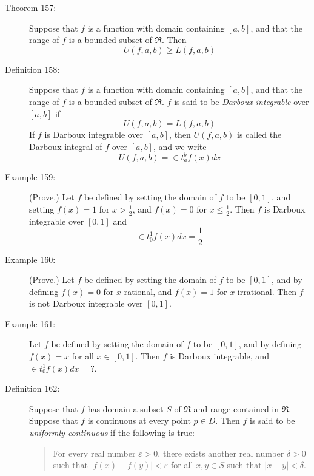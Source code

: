 \documentclass{article}
\begin{document}
\begin{description}
  \item[Theorem 157:] Suppose that $f$ is a function with domain containing $[a,b]$, and that the range of $f$ is a bounded subset of $\Re$. Then
    \begin{equation*}
    U(f,a,b) \geq L(f,a,b)
    \end{equation*}

  \item[Definition 158:] Suppose that $f$ is a function with domain containing $[a,b]$, and that the range of $f$ is a bounded subset of $\Re$. $f$ is said to be \emph{Darboux integrable} over $[a,b]$ if
    \begin{equation*}
    U(f,a,b) = L(f,a,b)
    \end{equation*}
    If $f$ is Darboux integrable over $[a,b]$, then $U(f,a,b)$ is called the Darboux integral of $f$ over $[a,b]$, and we write
    \begin{equation*}
    U(f,a,b) = \in t_{a}^{b} f(x) dx
    \end{equation*}

  \item[Example 159:] (Prove.) Let $f$ be defined by setting the domain of $f$ to be $[0,1]$, and setting $f(x)=1$ for $x > \frac{1}{2}$, and $f(x)=0$ for $x \leq \frac{1}{2}$. Then $f$ is Darboux integrable over $[0,1]$ and
    \begin{equation*}
    \in t_{0}^{1} f(x) dx = \frac{1}{2}
    \end{equation*}

  \item[Example 160:] (Prove.) Let $f$ be defined by setting the domain of $f$ to be $[0,1]$, and by defining $f(x) = 0$ for $x$ rational, and $f(x) =1$ for $x$ irrational. Then $f$ is not Darboux integrable over $[0,1]$.

  \item[Example 161:] Let $f$ be defined by setting the domain of $f$ to be $[0,1]$, and by defining $f(x) = x$ for all $x \in [0,1]$. Then $f$ is Darboux integrable, and $\in t_{0}^{1}f(x) dx = ?$.

  \item[Definition 162:] Suppose that $f$ has domain a subset $S$ of $\Re$ and range contained in $\Re$. Suppose that $f$ is continuous at every point $p \in D$. Then $f$ is said to be \emph{uniformly continuous} if the following is true: 
    \begin{quote}
    For every real number $\varepsilon > 0$, there exists another real number $\delta > 0$ such that $|f(x)-f(y)| < \varepsilon$ for all $x,y \in S$ such that $|x-y| < \delta$.
    \end{quote}


\end{description}
\end{document}
